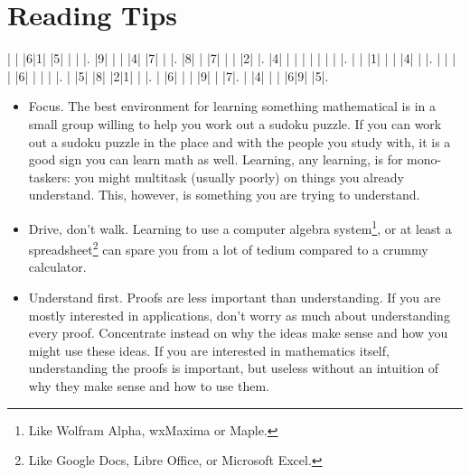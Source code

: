 \section*{Reading Tips}
\begin{marginfigure}
\begin{smallsudoku} %
| | |6|1| |5| | | |.
|9| | | |4| |7| | |.
|8| | |7| | | |2| |.
|4| | | | | | | | |.
| | |1| | | |4| | |.
| | | | |6| | | | |.
| |5| |8| |2|1| | |.
| |6| | | |9| | |7|.
| |4| | | |6|9| |5|.
\end{smallsudoku}
\caption{A simple sudoku puzzle.  Each row, column and $3 \times 3$ subgrid must contains all of the digits from 1 to 9.}
\label{fig:sudoku-simple}
\end{marginfigure}
\begin{itemize}
\item Focus. The best environment for learning something mathematical is in a small group willing to help you work out a sudoku puzzle.  If you can work out a sudoku puzzle in the place and with the people you study with, it is a good sign you can learn math as well.  Learning, any learning, is for mono-taskers: you might multitask (usually poorly) on things you already understand.  This, however, is something you are trying to understand.
\item Drive, don't walk. Learning to use a computer algebra system\footnote{Like Wolfram Alpha, wxMaxima or Maple.}, or at least a spreadsheet\footnote{Like Google Docs, Libre Office, or Microsoft Excel.} can spare you from a lot of tedium compared to a crummy calculator.
\item Understand first. Proofs are less important than understanding.  If you are mostly interested in applications, don't worry as much about understanding every proof.  Concentrate instead on why the ideas make sense and how you might use these ideas.  If you are interested in mathematics itself, understanding the proofs is important, but useless without an intuition of why they make sense and how to use them.
\end{itemize}
